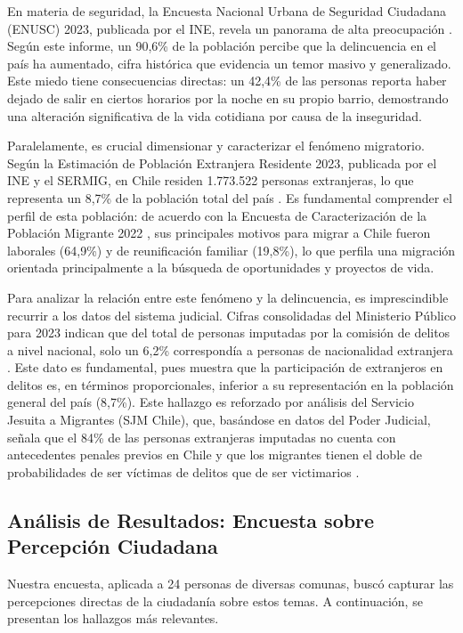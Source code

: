 \documentclass[12pt, a4paper]{article}
\begin{document}
En materia de seguridad, la Encuesta Nacional Urbana de Seguridad Ciudadana (ENUSC) 2023, publicada por el INE, revela un panorama de alta preocupación \autocite{INE2024enusc}. Según este informe, un 90,6\% de la población percibe que la delincuencia en el país ha aumentado, cifra histórica que evidencia un temor masivo y generalizado. Este miedo tiene consecuencias directas: un 42,4\% de las personas reporta haber dejado de salir en ciertos horarios por la noche en su propio barrio, demostrando una alteración significativa de la vida cotidiana por causa de la inseguridad.

Paralelamente, es crucial dimensionar y caracterizar el fenómeno migratorio. Según la Estimación de Población Extranjera Residente 2023, publicada por el INE y el SERMIG, en Chile residen 1.773.522 personas extranjeras, lo que representa un 8,7\% de la población total del país \autocite{INE2024estimacion}. Es fundamental comprender el perfil de esta población: de acuerdo con la Encuesta de Caracterización de la Población Migrante 2022 \autocite{SERMIG2023encuesta}, sus principales motivos para migrar a Chile fueron laborales (64,9\%) y de reunificación familiar (19,8\%), lo que perfila una migración orientada principalmente a la búsqueda de oportunidades y proyectos de vida.

Para analizar la relación entre este fenómeno y la delincuencia, es imprescindible recurrir a los datos del sistema judicial. Cifras consolidadas del Ministerio Público para 2023 indican que del total de personas imputadas por la comisión de delitos a nivel nacional, solo un 6,2\% correspondía a personas de nacionalidad extranjera \autocite{MP2023}. Este dato es fundamental, pues muestra que la participación de extranjeros en delitos es, en términos proporcionales, inferior a su representación en la población general del país (8,7\%). Este hallazgo es reforzado por análisis del Servicio Jesuita a Migrantes (SJM Chile), que, basándose en datos del Poder Judicial, señala que el 84\% de las personas extranjeras imputadas no cuenta con antecedentes penales previos en Chile y que los migrantes tienen el doble de probabilidades de ser víctimas de delitos que de ser victimarios \autocite{SJM2024seguridad}.

\subsection{Análisis de Resultados: Encuesta sobre Percepción Ciudadana}
Nuestra encuesta, aplicada a 24 personas de diversas comunas, buscó capturar las percepciones directas de la ciudadanía sobre estos temas. A continuación, se presentan los hallazgos más relevantes.
\end{document}
